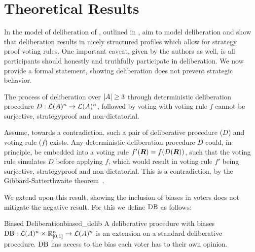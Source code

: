 \newpage \chapter{Theoretical Results} \label{theory}


In the model of deliberation of
\citet{radDeliberationSinglePeakednessCoherent2021}, outlined in
, aim to model deliberation and show that
deliberation results in nicely structured profiles which allow for strategy
proof voting rules. One important caveat, given by the authors as well, is all
participants should honestly and truthfully participate in deliberation. We now
provide a formal statement, showing deliberation does not prevent strategic
behavior.

\begin{proposition} The process of deliberation over $|A| \geq 3$
	through deterministic deliberation procedure \({D}:
	\mathcal{L}(A)^n \to \mathcal{L}(A)^n\), followed by voting
	with voting rule $f$ cannot be surjective, strategyproof and
	non-dictatorial.

\label{proposition:deterministic-delib} \end{proposition}

\begin{proofc} Assume, towards a contradiction, such a pair of deliberative
procedure ($D$) and voting rule (\(f\)) exists. Any deterministic deliberation
procedure $D$ could, in principle, be embedded into a voting rule
$f'(\boldsymbol{R}) = f(D(\boldsymbol{R}))$, such that the voting rule
simulates $D$ before applying $f$, which would result in  voting rule $f'$
being surjective, strategyproof and non-dictatorial. This is a contradiction,
by the Gibbard-Satterthwaite
theorem~\citep{gibbardManipulationVotingSchemes1973,satterthwaiteStrategyproofnessArrowsConditions1975}.
\end{proofc}


We extend upon this result, showing the inclusion of biases in voters does not
mitigate the negative result. For this we define $\operatorname{DB}$ as
follows:

\begin{definition}{Biased Deliberation}{biased_delib} A deliberative procedure
	with biases $\operatorname{DB} : \mathcal{L}(A) ^ n \times
	\mathbb{R}_{[0,1]}^n \to \mathcal{L}(A)^n$ is an extension on a
	standard deliberative procedure. \(\operatorname{DB}\) has access to
	the bias each voter has to their own opinion. \end{definition}

